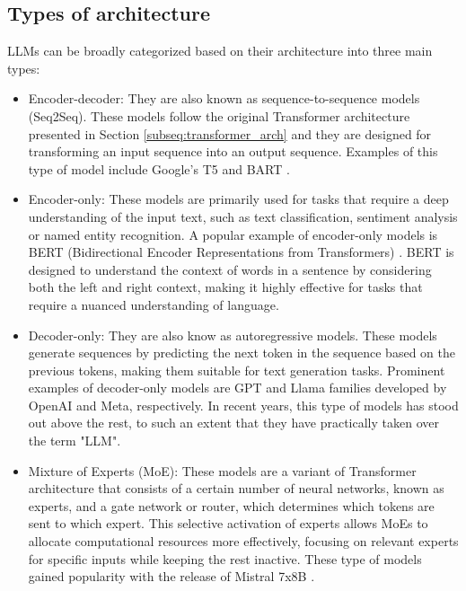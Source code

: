 \documentclass[11pt,english,listoffigures,listoftables]{tfgetsinf}
\begin{document}
\subsection{Types of architecture}

LLMs can be broadly categorized based on their architecture into three main types:

\begin{itemize}
    \item Encoder-decoder: They are also known as sequence-to-sequence models (Seq2Seq). These models follow the original Transformer architecture presented in Section \ref{subseq:transformer_arch} and they are designed for transforming an input sequence into an output sequence. Examples of this type of model include Google's T5\cite{raffel2020t5} and BART \cite{lewis2019bart}.

    \item Encoder-only: These models are primarily used for tasks that require a deep understanding of the input text, such as text classification, sentiment analysis or named entity recognition. A popular example of encoder-only models is BERT (Bidirectional Encoder Representations from Transformers) \cite{devlin2018bert}. BERT is designed to understand the context of words in a sentence by considering both the left and right context, making it highly effective for tasks that require a nuanced understanding of language.

    \item Decoder-only: They are also know as autoregressive models. These models generate sequences by predicting the next token in the sequence based on the previous tokens, making them suitable for text generation tasks. Prominent examples of decoder-only models are GPT \cite{Radford2018gpt1} \cite{Radford2019gpt2} \cite{brown2020gpt3} \cite{achiam2023gpt4} and Llama \cite{touvron2023llama} \cite{touvron2023llama2} families developed by OpenAI and Meta, respectively. In recent years, this type of models has stood out above the rest, to such an extent that they have practically taken over the term "LLM".

    \item Mixture of Experts (MoE): These models are a variant of Transformer architecture that consists of a certain number of neural networks, known as experts, and a gate network or router, which determines which tokens are sent to which expert. This selective activation of experts allows MoEs to allocate computational resources more effectively, focusing on relevant experts for specific inputs while keeping the rest inactive. These type of models gained popularity with the release of Mistral 7x8B \cite{jiang2024mixtral}.
\end{itemize}
\end{document}
